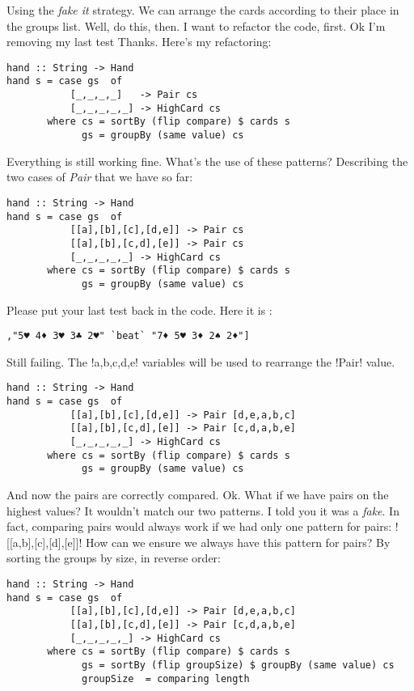 \lhA Using the \emph{fake it} strategy. We can arrange the cards according to their place in the groups list.
\lhN Well, do this, then.
\lhA I want to refactor the code, first. 
\lhN Ok I'm removing my last test
\lhA \success Thanks. Here's my refactoring:
\begin{lstlisting}[frame=single]
hand :: String -> Hand
hand s = case gs  of
           [_,_,_,_]   -> Pair cs
           [_,_,_,_,_] -> HighCard cs 
       where cs = sortBy (flip compare) $ cards s
             gs = groupBy (same value) cs
\end{lstlisting} %
\success Everything is still working fine.
\lhN What's the use of these patterns?
\lhA \success Describing the two cases of \emph{Pair} that we have so far:
\begin{lstlisting}[frame=single]
hand :: String -> Hand
hand s = case gs  of
           [[a],[b],[c],[d,e]] -> Pair cs
           [[a],[b],[c,d],[e]] -> Pair cs
           [_,_,_,_,_] -> HighCard cs 
       where cs = sortBy (flip compare) $ cards s
             gs = groupBy (same value) cs
\end{lstlisting} %
\success Please put your last test back in the code.
\lhN Here it is :
\begin{lstlisting}[frame=single]
    ,"5♥ 4♦ 3♥ 3♣ 2♥" `beat` "7♦ 5♥ 3♦ 2♠ 2♦"]
\end{lstlisting}
\failure Still failing.
\lhA \failure The \il!a,b,c,d,e! variables will be used to rearrange the \il!Pair! value. 
\begin{lstlisting}[frame=single]
hand :: String -> Hand
hand s = case gs  of
           [[a],[b],[c],[d,e]] -> Pair [d,e,a,b,c]
           [[a],[b],[c,d],[e]] -> Pair [c,d,a,b,e]
           [_,_,_,_,_] -> HighCard cs 
       where cs = sortBy (flip compare) $ cards s
             gs = groupBy (same value) cs
\end{lstlisting} %
\success And now the pairs are correctly compared.
\lhN Ok. What if we have pairs on the highest values? It wouldn't match our two patterns. 
\lhA I told you it was a \emph{fake}. In fact, comparing pairs would always work if we had only one pattern for pairs: \il![[a,b],[c],[d],[e]]!
\lhN How can we ensure we always have this pattern for pairs?
\lhA By sorting the groups by size, in reverse order:
\begin{lstlisting}[frame=single]
hand :: String -> Hand
hand s = case gs  of
           [[a],[b],[c],[d,e]] -> Pair [d,e,a,b,c]
           [[a],[b],[c,d],[e]] -> Pair [c,d,a,b,e]
           [_,_,_,_,_] -> HighCard cs 
       where cs = sortBy (flip compare) $ cards s
             gs = sortBy (flip groupSize) $ groupBy (same value) cs
             groupSize  = comparing length 
\end{lstlisting}
